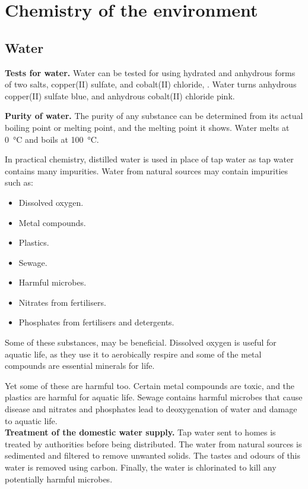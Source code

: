 \section{Chemistry of the environment}
\subsection{Water}

\textbf{Tests for water.} Water can be tested for using hydrated and anhydrous forms of two salts,
copper(II) sulfate,  and cobalt(II) chloride, . Water turns anhydrous
copper(II) sulfate blue, and anhydrous cobalt(II) chloride pink.

\textbf{Purity of water.} The purity of any substance can be determined from its actual boiling
point or melting point, and the melting point it shows. Water melts at \SI{0}{\celsius} and
boils at \SI{100}{\celsius}.

In practical chemistry, distilled water is used in place of tap water as tap water contains many
impurities. Water from natural sources may contain impurities such as:
\begin{itemize}
	\item Dissolved oxygen.
	\item Metal compounds.
	\item Plastics.
	\item Sewage.
	\item Harmful microbes.
	\item Nitrates from fertilisers.
	\item Phosphates from fertilisers and detergents.
\end{itemize}
Some of these substances, may be beneficial. Dissolved oxygen is useful for aquatic life, as they
use it to aerobically respire and some of the metal compounds are essential minerals for life.

Yet some of these are harmful too. Certain metal compounds are toxic, and the plastics are harmful
for aquatic life. Sewage contains harmful microbes that cause disease and nitrates and phosphates
lead to deoxygenation of water and damage to aquatic life.\\

\textbf{Treatment of the domestic water supply.} Tap water sent to homes is treated by authorities
before being distributed. The water from natural sources is sedimented and filtered to remove
unwanted solids. The tastes and odours of this water is removed using carbon. Finally, the
water is chlorinated to kill any potentially harmful microbes.

